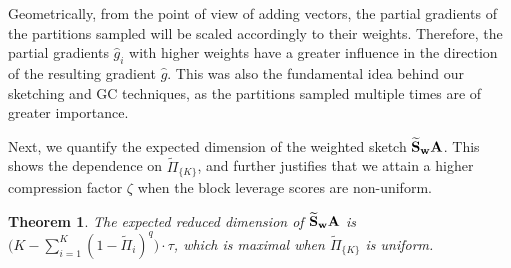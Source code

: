 \documentclass[journal,letterpaper,onecolumn,twoside,nofonttune]{IEEEtran}
\newcommand{\Ab}{\bold{A}}
\newcommand{\Sb}{\bold{S}}
\newcommand{\Sbwt}{\widetilde{\Sb}}
\newcommand{\Sbw}{\Sbwt_{\wb}}
\newcommand{\wb}{\bold{w}}
\newcommand{\gh}{\hat{g}}
\newcommand{\Pit}{\tilde{\Pi}}
\newtheorem{Thm}{Theorem}
\begin{document}
Geometrically, from the point of view of adding vectors, the partial gradients of the partitions sampled will be scaled accordingly to their weights. Therefore, the partial gradients $\gh_i$ with higher weights have a greater influence in the direction of the resulting gradient $\gh$. This was also the fundamental idea behind our sketching and GC techniques, as the partitions sampled multiple times are of greater importance.

Next, we quantify the expected dimension of the weighted sketch $\Sbw\Ab$. This shows the dependence on $\Pit_{\{K\}}$, and further justifies that we attain a higher compression factor $\zeta$ when the block leverage scores are non-uniform.

\begin{Thm}
\label{thm_exp_dim}
The expected reduced dimension of $\Sbw\Ab$ is $\Big(K-\sum_{i=1}^K(1-\Pit_i)^q\Big)\cdot\tau$, which is maximal when $\Pit_{\{K\}}$ is uniform.
\end{Thm}
\end{document}

